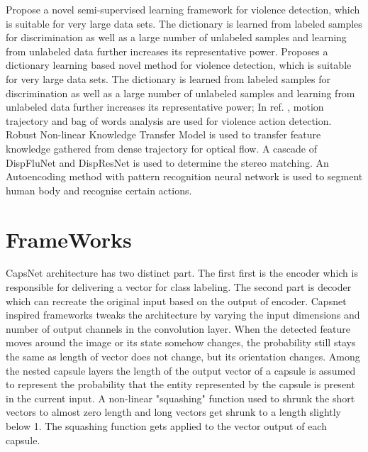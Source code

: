 \documentclass[11pt,english]{article}
\begin{document}
\citep{zhang2018semi} Propose a novel semi-supervised learning framework for violence detection, which is suitable for very large data sets. The dictionary is learned from labeled samples for discrimination as well as a large number of unlabeled samples and learning from unlabeled data further increases its representative power. \citep{szegedy2015going} Proposes a dictionary learning based novel method for violence detection, which is suitable for very large data sets. The dictionary is learned from labeled samples for discrimination as well as a large number of unlabeled samples and learning from unlabeled data further increases its representative power; In ref. \citep{datta2002person}, \citep{nievas2011violence} motion trajectory and bag of words analysis are used for violence action detection. Robust Non-linear Knowledge Transfer Model \citep{rahmani2018learning} is used to transfer feature knowledge gathered from dense trajectory for optical flow.
A cascade \citep{weinzaepfel2013deepflow} of DispFluNet and DispResNet is used to determine the stereo matching. An Autoencoding\citep{xiao2017human} method with pattern recognition neural network is used to segment human body and recognise certain actions.
 

\section{FrameWorks}
CapsNet \citep{sabour2017dynamic} architecture has two distinct part. The first first is the encoder which is responsible for delivering a vector for class labeling. The second part is decoder which can recreate the original input based on the output of encoder. Capsnet inspired frameworks tweaks the architecture by varying the input dimensions and number of output channels in the convolution layer. When the detected feature moves around the image or its state somehow changes, the probability still stays the same as length of vector does not change, but its orientation changes. Among the nested capsule layers the length of the output vector of a capsule is assumed to represent the probability that the entity represented by the capsule is present in the current input. A non-linear "squashing" function used to shrunk the short vectors to almost zero length and long vectors get shrunk to a length slightly below 1. The squashing function gets applied to the vector output of each capsule.
\end{document}
